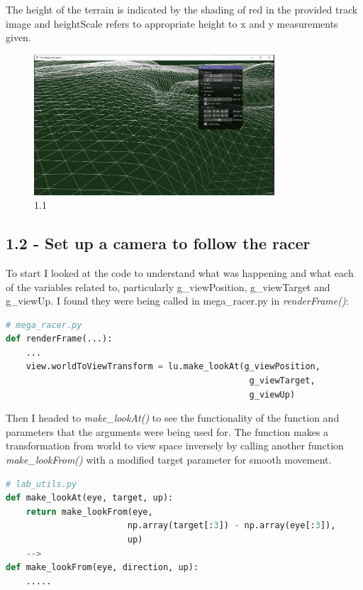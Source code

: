 \documentclass[a4 paper, 12pt]{article}
\begin{document}
The height of the terrain is indicated by the shading of red in the provided track image and heightScale refers to appropriate height to x and y measurements given. 
    \begin{figure} [H]
        \centering
        \includegraphics[width=0.8\textwidth, frame]
            {./images/mega_racer/1.1.PNG}
        \caption{1.1}
    \end{figure}  
   

\subsection{1.2 - Set up a camera to follow the racer}
To start I looked at the code to understand what was happening and what each of the variables related to, particularly g\_viewPosition, g\_viewTarget and g\_viewUp. I found they were being called in mega\_racer.py in \textit{renderFrame()}:
    \begin{lstlisting}[language=python]
# mega_racer.py 
def renderFrame(...):
    ...
    view.worldToViewTransform = lu.make_lookAt(g_viewPosition, 
                                                g_viewTarget, 
                                                g_viewUp)
    \end{lstlisting}

Then I headed to \textit{make\_lookAt()} to see the functionality of the function and parameters that the arguments were being used for. The function makes a transformation from world to view space inversely by calling another function \textit{make\_lookFrom()} with a modified target parameter for smooth movement.  
    \begin{lstlisting}[language=python]
# lab_utils.py
def make_lookAt(eye, target, up):
    return make_lookFrom(eye, 
                        np.array(target[:3]) - np.array(eye[:3]), 
                        up)
    --> 
def make_lookFrom(eye, direction, up):
    .....
    \end{lstlisting}
\end{document}
